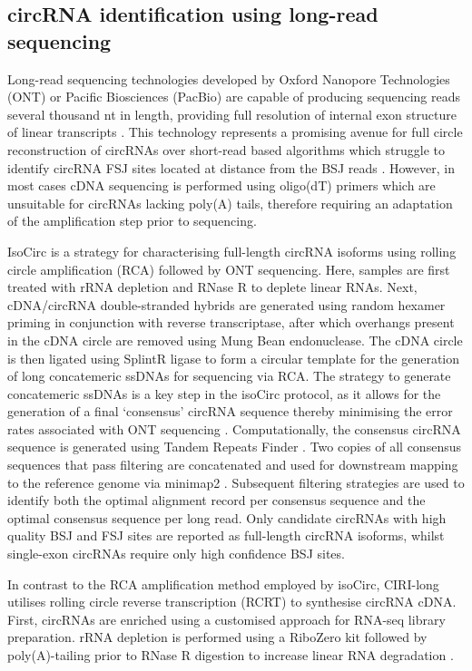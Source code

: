 \documentclass[pdflatex,sn-mathphys-num]{sn-jnl}
\begin{document}
\subsection{circRNA identification using long-read sequencing}
Long-read sequencing technologies developed by Oxford Nanopore Technologies (ONT) or Pacific Biosciences (PacBio) are capable of producing sequencing reads several thousand nt in length, providing full resolution of internal exon structure of linear transcripts \cite{Rhoads2015Oct,Deamer2016May,Byrne2017Jul,vanDijk2018Sep}. This technology represents a promising avenue for full circle reconstruction of circRNAs over short-read based algorithms which struggle to identify circRNA FSJ sites located at distance from the BSJ reads \cite{CIRI-AS,CIRI-full,FUCHS}. However, in most cases cDNA sequencing is performed using oligo(dT) primers which are unsuitable for circRNAs lacking poly(A) tails, therefore requiring an adaptation of the amplification step prior to sequencing. \par
IsoCirc \cite{isoCirc} is a strategy for characterising full-length circRNA isoforms using rolling circle amplification (RCA) followed by ONT sequencing. Here, samples are first treated with rRNA depletion and RNase R to deplete linear RNAs. Next, cDNA/circRNA double-stranded hybrids are generated using random hexamer priming in conjunction with reverse transcriptase, after which overhangs present in the cDNA circle are removed using Mung Bean endonuclease. The cDNA circle is then ligated using SplintR ligase to form a circular template for the generation of long concatemeric ssDNAs for sequencing via RCA. The strategy to generate concatemeric ssDNAs is a key step in the isoCirc protocol, as it allows for the generation of a final `consensus' circRNA sequence thereby minimising the error rates associated with ONT sequencing \cite{Jain2015Apr}. Computationally, the consensus circRNA sequence is generated using Tandem Repeats Finder \cite{Benson1999Jan}. Two copies of all consensus sequences that pass filtering are concatenated and used for downstream mapping to the reference genome via minimap2 \cite{Li2018Sep}. Subsequent filtering strategies are used to identify both the optimal alignment record per consensus sequence and the optimal consensus sequence per long read. Only candidate circRNAs with high quality BSJ and FSJ sites are reported as full-length circRNA isoforms, whilst single-exon circRNAs require only high confidence BSJ sites. \par
In contrast to the RCA amplification method employed by isoCirc, CIRI-long \cite{CIRIlong} utilises rolling circle reverse transcription (RCRT) to synthesise circRNA cDNA. First, circRNAs are enriched using a customised approach for RNA-seq library preparation. rRNA depletion is performed using a RiboZero kit followed by poly(A)-tailing prior to RNase R digestion to increase linear RNA degradation \cite{Xiao2019Sep}.
\end{document}
